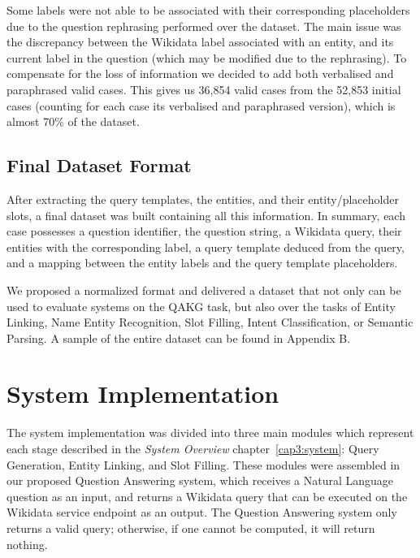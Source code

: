 Some labels were not able to be associated with their corresponding placeholders due to the 
question rephrasing performed over the \LCQuADtwo{} dataset. The main issue was the discrepancy between the 
Wikidata label associated with an entity, and its current label in the question (which may be 
modified due to the rephrasing). To compensate for the loss of information we decided to add 
both verbalised and paraphrased valid cases. This gives us 36,854 valid cases from the 52,853 
initial cases (counting for each case its verbalised and paraphrased version), which is almost 
70\% of the dataset.

\subsection{Final Dataset Format}
\label{cap4:experimentalDesign/QaDataset/finalFormat}
After extracting the query templates, the entities, and their entity/placeholder slots, a final 
\LCQuADtwo{} dataset was built containing all this information. In summary, each case possesses a 
question identifier, the question string, a Wikidata \SPARQL{} query, their entities with the 
corresponding label, a query template deduced from the \SPARQL{} query, and a mapping between the 
entity labels and the query template placeholders. 

We proposed a normalized format and delivered a dataset that not only can be used to evaluate 
systems on the QAKG task, but also over the tasks of Entity Linking, Name Entity Recognition, 
Slot Filling, Intent Classification, or Semantic Parsing. A sample of the entire dataset can be 
found in Appendix B.

\section{System Implementation}
\label{cap4:experimentalDesign/systemImplementation}
The system implementation was divided into three main modules which represent each stage 
described in the \textit{System Overview} chapter~\ref{cap3:system}: Query Generation, Entity Linking, and Slot 
Filling. These modules were assembled in our proposed Question Answering system, which receives 
a Natural Language question as an input, and returns a Wikidata \SPARQL{} query that can be executed 
on the Wikidata service endpoint as an output. The Question Answering system only returns a valid 
\SPARQL{} query; otherwise, if one cannot be computed, it will return nothing.

